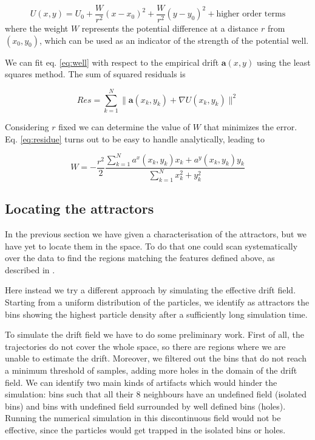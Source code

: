 \documentclass[a4paper]{article}
\begin{document}
\begin{equation} \label{eq:well}
U(x, y) = U_0 + \frac{W}{r^2}\left(x - x_0\right)^2 + \frac{W}{r^2}\left(y - y_0\right)^2 + \text{higher order terms}
\end{equation}
where the weight $W$ represents the potential difference at a distance $r$ from $(x_0, y_0)$, which can be used as an indicator of the strength of the potential well.

We can fit eq. \ref{eq:well} with respect to the empirical drift $\bm{a}(x, y)$ using the least squares method. The sum of squared residuals is

\begin{equation} \label{eq:residue}
Res = \sum_{k = 1}^N \| \bm{a}(x_k, y_k) + \nabla U(x_k, y_k) \|^2
\end{equation}

Considering $r$ fixed we can determine the value of $W$ that minimizes the error. Eq. \ref{eq:residue} turns out to be easy to handle analytically, leading to

\begin{equation}
W = - \frac{r^2}{2} \frac{\sum_{k = 1}^N a^x(x_k, y_k) x_k + a^y(x_k, y_k) y_k}{\sum_{k = 1}^N x_k^2 + y_k^2}
\end{equation}

\subsection{Locating the attractors}

In the previous section we have given a characterisation of the attractors, but we have yet to locate them in the space. To do that one could scan systematically over the data to find the regions matching the features defined above, as described in \cite{hoze2012}.

Here instead we try a different approach by simulating the effective drift field. Starting from a uniform distribution of the particles, we identify as attractors the bins showing the highest particle density after a sufficiently long simulation time.

To simulate the drift field we have to do some preliminary work. First of all, the trajectories do not cover the whole space, so there are regions where we are unable to estimate the drift. Moreover, we filtered out the bins that do not reach a minimum threshold of samples, adding more holes in the domain of the drift field.
We can identify two main kinds of artifacts which would hinder the simulation: bins such that all their 8 neighbours have an undefined field (isolated bins) and bins with undefined field surrounded by well defined bins (holes). Running the numerical simulation in this discontinuous field would not be effective, since the particles would get trapped in the isolated bins or holes.
\end{document}
